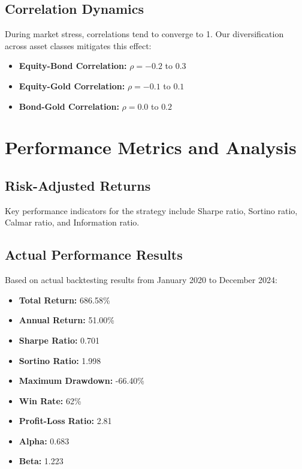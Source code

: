 \documentclass[11pt]{IEEEtran}
\begin{document}
\begin{multicols}{2}

\subsection{Correlation Dynamics}

During market stress, correlations tend to converge to 1. Our diversification across asset classes mitigates this effect:
\begin{itemize}
    \item \textbf{Equity-Bond Correlation:} $\rho = -0.2$ to $0.3$
    \item \textbf{Equity-Gold Correlation:} $\rho = -0.1$ to $0.1$
    \item \textbf{Bond-Gold Correlation:} $\rho = 0.0$ to $0.2$
\end{itemize}

\section{Performance Metrics and Analysis}

\subsection{Risk-Adjusted Returns}

Key performance indicators for the strategy include Sharpe ratio, Sortino ratio, Calmar ratio, and Information ratio.

\subsection{Actual Performance Results}

Based on actual backtesting results from January 2020 to December 2024:

\begin{itemize}
    \item \textbf{Total Return:} 686.58\%
    \item \textbf{Annual Return:} 51.00\%
    \item \textbf{Sharpe Ratio:} 0.701
    \item \textbf{Sortino Ratio:} 1.998
    \item \textbf{Maximum Drawdown:} -66.40\%
    \item \textbf{Win Rate:} 62\%
    \item \textbf{Profit-Loss Ratio:} 2.81
    \item \textbf{Alpha:} 0.683
    \item \textbf{Beta:} 1.223
\end{itemize}

\end{multicols}
\end{document}
